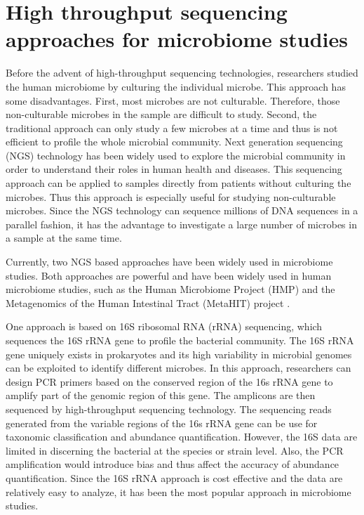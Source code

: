 \section{High throughput sequencing approaches for microbiome studies}
Before the advent of high-throughput sequencing technologies, researchers studied the human microbiome by culturing the individual microbe. This approach has some disadvantages. First, most microbes are not culturable. Therefore, those non-culturable microbes in the sample are difficult to study. Second, the traditional approach can only study a few microbes at a time and thus is not efficient to profile the whole microbial community. Next generation sequencing (NGS) technology has been widely used to explore the microbial community in order to understand their roles in human health and diseases. This sequencing approach can be applied to samples directly from patients without culturing the microbes. Thus this approach is especially useful for studying non-culturable microbes. Since the NGS technology can sequence millions of DNA sequences in a parallel fashion, it has the advantage to investigate a large number of microbes in a sample at the same time.


Currently, two NGS based approaches have been widely used in microbiome studies. Both approaches are powerful and have been widely used in human microbiome studies, such as the Human Microbiome Project (HMP) \citep{turnbaugh2007human} and the Metagenomics of the Human Intestinal Tract (MetaHIT) project \citep{qin2010human}. 

One approach is based on 16S ribosomal RNA (rRNA) sequencing, which sequences the 16S rRNA gene to profile the bacterial community. The 16S rRNA gene uniquely exists in prokaryotes and its high variability in microbial genomes can be exploited to identify different microbes. In this approach, researchers can design PCR primers based on the conserved region of the 16s rRNA gene to amplify part of the genomic region of this gene. The amplicons are then sequenced by high-throughput sequencing technology. The sequencing reads generated from the variable regions of the 16s rRNA gene can be use for taxonomic classification and abundance quantification. However, the 16S data are limited in discerning the bacterial at the species or strain level. Also, the PCR amplification would introduce bias and thus affect the accuracy of abundance quantification. Since the 16S rRNA approach is cost effective and the data are relatively easy to analyze, it has been the most popular approach in microbiome studies. 

